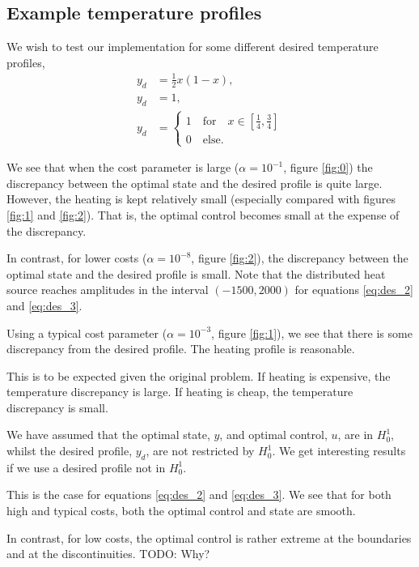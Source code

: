 \subsection{Example temperature profiles}
We wish to test our implementation for some different desired temperature profiles,
\begin{align}
    y_d &= \frac{1}{2}x(1-x), \label{eq:des_1} \\
    y_d &= 1, \label{eq:des_2}\\
    y_d &= \begin{cases}
        1 \quad \text{for} \quad x \in \left[ \frac{1}{4}, \frac{3}{4}\right] \\
        0 \quad \text{else}.
    \end{cases} \label{eq:des_3}
\end{align}

We see that when the cost parameter is large (\( \alpha = 10^{-1} \), figure \ref{fig:0})
the discrepancy between the optimal state and the
desired profile is quite large.
However, the heating is kept relatively small
(especially compared with figures \ref{fig:1} and \ref{fig:2}).
That is, the optimal control becomes small at the
expense of the discrepancy.

In contrast, for lower costs (\( \alpha = 10^{-8} \),
figure \ref{fig:2}), the discrepancy between the optimal state
and the desired profile is small. 
Note that the distributed heat source reaches amplitudes in
the interval \( (-1500,2000) \) for equations \eqref{eq:des_2} and \eqref{eq:des_3}.

Using a typical cost parameter (\( \alpha = 10^{-3} \), figure \ref{fig:1}),
we see that there is some discrepancy from the
desired profile. The heating profile is reasonable.

This is to be expected given the original problem.
If heating is expensive, the temperature discrepancy is large.
If heating is cheap, the temperature discrepancy is small.

We have assumed that the optimal state, \( y \), and optimal control, \( u \),
are in $H_0^1$, whilst the desired profile, \( y_d \),
are not restricted by \( H_0^1 \).
We get interesting results if we use a desired profile not in $H_0^1$.

This is the case for equations \eqref{eq:des_2} and \eqref{eq:des_3}.
We see that for both high and typical costs,
both the optimal control and state are smooth.

In contrast, for low costs, the optimal control
is rather extreme at the boundaries and at
the discontinuities. TODO: Why?

